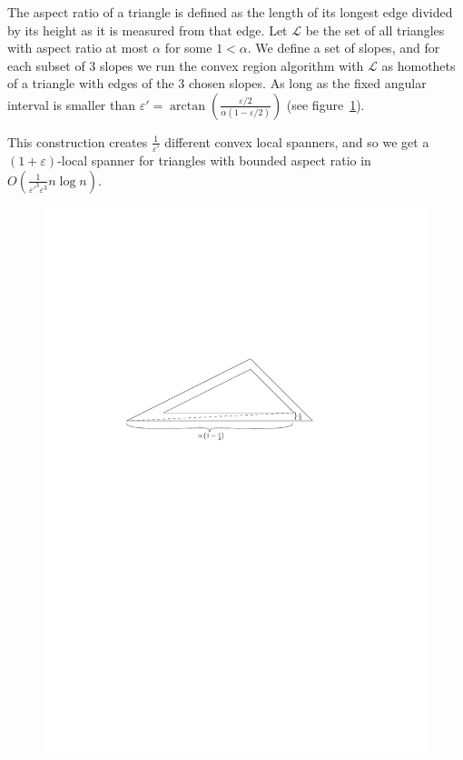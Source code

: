 \documentclass{article}
\newcommand{\eps}{\varepsilon}
\newcommand{\LL}{\mathcal{L}}
\begin{document}
	The aspect ratio of a triangle is defined as the length of its longest edge divided by its height as it is measured from that edge. Let $\LL$ be the set of all triangles with aspect ratio at most $\alpha$ for some $1 < \alpha$. We define a set of slopes, and for each subset of 3 slopes we run the convex region algorithm with $\LL$ as homothets of a triangle with edges of the 3 chosen slopes. As long as the fixed angular interval is smaller than $\eps' = \arctan\left(\frac{\eps/2}{\alpha(1-\eps/2)}\right)$ (see figure~\ref{fig:triangle_with_shadow}).
	
	This construction creates $\frac{1}{\eps'}$ different convex local spanners, and so we get a $(1+\eps)$-local spanner for triangles with bounded aspect ratio in $O\left(\frac{1}{\eps'^3\eps^3} n\log n\right)$.

	
	\begin{figure}
		\centering
		\includegraphics[width=0.6\linewidth]{triangle_shadow.pdf}
		\label{fig:triangle_with_shadow}
	\end{figure}

\end{document}
